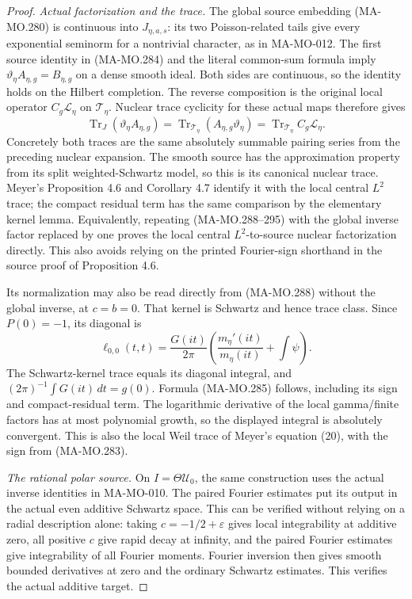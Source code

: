\begin{proof}
\emph{Actual factorization and the trace.}
The global source embedding (MA-MO.280) is continuous into
\(J_{\eta,a,s}\): its two Poisson-related tails give every
exponential seminorm for a nontrivial character, as in
MA-MO-012. The first source identity in (MA-MO.284) and the
literal common-sum formula imply
\(\vartheta_\eta A_{\eta,g}=B_{\eta,g}\) on a dense smooth
ideal. Both sides are continuous, so the identity holds on
the Hilbert completion. The reverse composition is the
original local operator \(C_g\mathcal L_\eta\) on
\(\mathcal T_\eta\). Nuclear trace cyclicity for these
actual maps therefore gives
\[
 \operatorname{Tr}_J(\vartheta_\eta A_{\eta,g})
       =\operatorname{Tr}_{\mathcal T_\eta}
                    (A_{\eta,g}\vartheta_\eta)
       =\operatorname{Tr}_{\mathcal T_\eta}
                              C_g\mathcal L_\eta.
 \tag{MA-MO.296}
\]
Concretely both traces are the same absolutely summable
pairing series from the preceding nuclear expansion. The
smooth source has the approximation property from its split
weighted-Schwartz model, so this is its canonical nuclear
trace. Meyer's Proposition 4.6 and Corollary 4.7 identify it
with the local central \(L^2\) trace; the compact residual
term has the same comparison by the elementary kernel lemma.
Equivalently, repeating (MA-MO.288--295) with the global
inverse factor replaced by one proves the local central
\(L^2\)-to-source nuclear factorization directly. This
also avoids relying on the printed Fourier-sign shorthand
in the source proof of Proposition 4.6.

Its normalization may also be read directly from (MA-MO.288)
without the global inverse, at \(c=b=0\). That kernel is
Schwartz and hence trace class. Since \(P(0)=-1\), its
diagonal is
\[
 \ell_{0,0}(t,t)=\frac{G(it)}{2\pi}
       \left(\frac{m_\eta'(it)}{m_\eta(it)}
                                      +\int\psi\right).
 \tag{MA-MO.297}
\]
The Schwartz-kernel trace equals its diagonal integral, and
\((2\pi)^{-1}\int G(it)\,dt=g(0)\). Formula (MA-MO.285)
follows, including its sign and compact-residual term.
The logarithmic derivative of the local gamma/finite factors
has at most polynomial growth, so the displayed integral is
absolutely convergent. This is also the local Weil trace of
Meyer's equation (20), with the sign from (MA-MO.283).

\emph{The rational polar source.}
On \(I=\Theta\mathscr U_0\), the same construction uses
the actual inverse identities in MA-MO-010. The paired
Fourier estimates put its output in the actual even additive
Schwartz space. This can be verified without relying on a
radial description alone: taking \(c=-1/2+\varepsilon\)
gives local integrability at additive zero, all positive
\(c\) give rapid decay at infinity, and the paired Fourier
estimates give integrability of all Fourier moments. Fourier
inversion then gives smooth bounded derivatives at zero and
the ordinary Schwartz estimates. This verifies the actual
additive target.


\end{proof}
